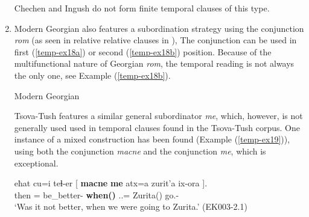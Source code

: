 \begin{enumerate}[label=\Roman*.]
Chechen and Ingush do not form finite temporal clauses of this type.

\item Modern Georgian also features a subordination strategy using the conjunction \textit{rom} (as seen in relative relative clauses in ), The conjunction can be used in first (\ref{temp-ex18a}) or second (\ref{temp-ex18b}) position. Because of the multifunctional nature of Georgian \textit{rom}, the temporal reading is not always the only one, see Example (\ref{temp-ex18b}).

\begin{exe}
	\ex\label{temp-ex18} 
    	Modern Georgian
\end{exe}

Tsova-Tush features a similar general subordinator \textit{me}, which, however, is not generally used used in temporal clauses found in the Tsova-Tush corpus. One instance of a mixed construction has been found (Example (\ref{temp-ex19})), using both the conjunction \textit{macne} and the conjunction \textit{me}, which is exceptional. 


	\begin{exe}
		\ex\label{temp-ex19}
		\gll eħat	cu=i 	teɬ-er	{{\normalfont[} \textbf{macne}}	\textbf{me}	atx=a	zurit'a	{ix-ora {\normalfont]}}. \\
		then	{\Neg}={\Q}	be\_better-{\Imprf}	\textbf{when({\Rel})}	\textbf{{\Subord}}  {\Fpl}.{\Excl}.{\Erg}={\Add}	Zurita({\Lat})	go.{\Ipfv}-{\Imprf}	\\
		\trans `Was it not better, when we were going to Zurita.’	
		\hfill (EK003-2.1)
	\end{exe}



\end{enumerate}
